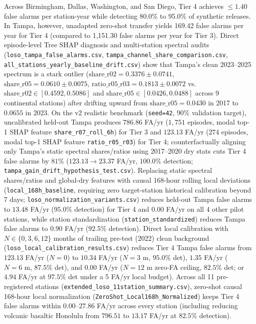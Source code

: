 \documentclass[11pt,a4paper]{article}
\begin{document}
\begin{framed}
Across Birmingham, Dallas, Washington, and San Diego, Tier 4 achieves $\le 1.40$ false alarms per station-year while detecting 80.0\% to 95.0\% of synthetic releases. In Tampa, however, unadapted zero-shot transfer yields 169.42 false alarms per year for Tier 4 (compared to 1,151.30 false alarms per year for Tier 3). Direct episode-level Tree SHAP diagnosis and multi-station spectral audits (\texttt{loso\_tampa\_false\_alarms.csv}, \texttt{tampa\_channel\_share\_comparison.csv}, \texttt{all\_stations\_yearly\_baseline\_drift.csv}) show that Tampa's clean 2023--2025 spectrum is a stark outlier ($\text{share\_r02} = 0.3376 \pm 0.0741$, $\text{share\_r05} = 0.0610 \pm 0.0075$, $\text{ratio\_r05\_r03} = 0.1813 \pm 0.0072$ vs.\ $\text{share\_r02} \in [0.4592, 0.5086]$ and $\text{share\_r05} \in [0.0426, 0.0488]$ across 9 continental stations) after drifting upward from $\text{share\_r05} = 0.0430$ in 2017 to $0.0655$ in 2023. On the v2 realistic benchmark (\texttt{seed=42}, 90\% validation target), uncalibrated held-out Tampa produces $786.86$ FA/yr ($1{,}751$ episodes, modal top-1 SHAP feature \texttt{share\_r07\_roll\_6h}) for Tier 3 and $123.13$ FA/yr ($274$ episodes, modal top-1 SHAP feature \texttt{ratio\_r05\_r03}) for Tier 4; counterfactually aligning only Tampa's static spectral shares/ratios using 2017--2020 dry stats cuts Tier 4 false alarms by $81\%$ ($123.13 \to 23.37$ FA/yr, $100.0\%$ detection; \texttt{tampa\_gain\_drift\_hypothesis\_test.csv}). Replacing static spectral shares/ratios and global-dry features with causal 168-hour rolling local deviations (\texttt{local\_168h\_baseline}, requiring zero target-station historical calibration beyond 7 days; \texttt{loso\_normalization\_variants.csv}) reduces held-out Tampa false alarms to $13.48$ FA/yr ($95.0\%$ detection) for Tier 4 and $0.00$ FA/yr on all 4 other pilot stations, while station standardization (\texttt{station\_standardized}) reduces Tampa false alarms to $0.90$ FA/yr ($92.5\%$ detection). Direct local calibration with $N \in \{0, 3, 6, 12\}$ months of trailing pre-test (2022) clean background (\texttt{loso\_local\_calibration\_results.csv}) reduces Tier 4 Tampa false alarms from $123.13$ FA/yr ($N=0$) to $10.34$ FA/yr ($N=3\text{ m}$, $95.0\%$ det), $1.35$ FA/yr ($N=6\text{ m}$, $87.5\%$ det), and $0.00$ FA/yr ($N=12\text{ m}$ zero-FA ceiling, $82.5\%$ det; or $4.94$ FA/yr at $97.5\%$ det under a 5 FA/yr local budget). Across all 11 pre-registered stations (\texttt{extended\_loso\_11station\_summary.csv}), zero-shot causal 168-hour local normalization (\texttt{ZeroShot\_Local168h\_Normalized}) keeps Tier 4 false alarms within $0.00\text{--}27.86$ FA/yr across every station (including reducing volcanic basaltic Honolulu from $796.51$ to $13.17$ FA/yr at $82.5\%$ detection).


\end{framed}
\end{document}
